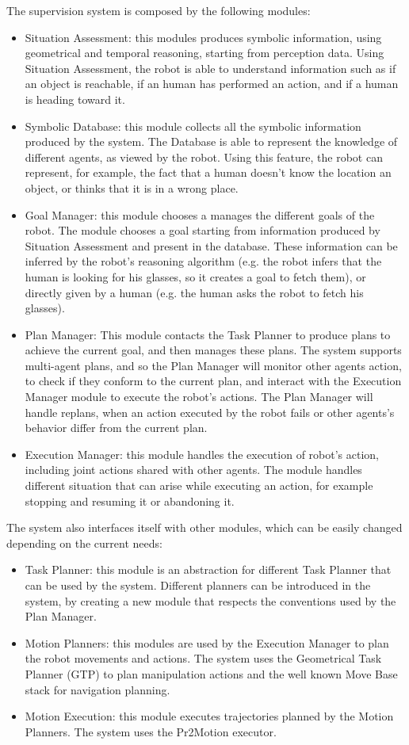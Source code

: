 The supervision system is composed by the following modules:
\begin{itemize}
\item Situation Assessment: this modules produces symbolic information, using geometrical and temporal reasoning, starting from perception data. Using Situation Assessment, the robot is able to understand information such as if an object is reachable, if an human has performed an action, and if a human is heading toward it.
\item Symbolic Database: this module collects all the symbolic information produced by the system. The Database is able to represent the knowledge of different agents, as viewed by the robot. Using this feature, the robot can represent, for example, the fact that a human doesn't know the location an object, or thinks that it is in a wrong place.
\item Goal Manager: this module chooses a manages the different goals of the robot. The module chooses a goal starting from information produced by Situation Assessment and present in the database. These information can be inferred by the robot's reasoning algorithm (e.g. the robot infers that the human is looking for his glasses, so it creates a goal to fetch them), or directly given by a human (e.g. the human asks the robot to fetch his glasses). 
\item Plan Manager: This module contacts the Task Planner to produce plans to achieve the current goal, and then manages these plans. The system supports multi-agent plans, and so the Plan Manager will monitor other agents action, to check if they conform to the current plan, and interact with the Execution Manager module to execute the robot's actions. The Plan Manager will handle replans, when an action executed by the robot fails or other agents's behavior differ from the current plan.
\item Execution Manager: this module handles the execution of robot's action, including joint actions shared with other agents. The module handles different situation that can arise while executing an action, for example stopping and resuming it or abandoning it.
\end{itemize}

The system also interfaces itself with other modules, which can be easily changed depending on the current needs:

\begin{itemize}
\item Task Planner: this module is an abstraction for different Task Planner that can be used by the system. Different planners can be introduced in the system, by creating a new module that respects the conventions used by the Plan Manager.
\item Motion Planners:  this modules are used by the Execution Manager to plan the robot movements and actions. The system uses the Geometrical Task Planner (GTP) to plan manipulation actions and the well known Move Base stack for navigation planning. 
\item Motion Execution: this module executes trajectories planned by the Motion Planners. The system uses the Pr2Motion executor.
\end{itemize}

